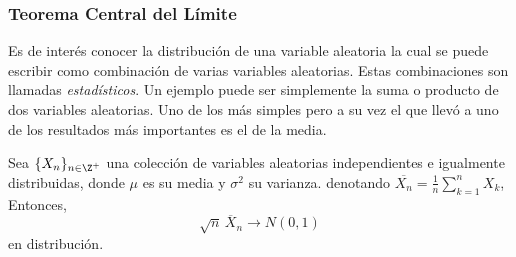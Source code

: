 \subsubsection{Teorema Central del Límite}
Es de interés conocer la distribución de una variable aleatoria la
cual se puede escribir como combinación de varias variables
aleatorias. Estas combinaciones son llamadas \emph{estadísticos}.
Un ejemplo puede ser simplemente la suma o producto de dos variables
aleatorias. Uno de los más simples pero a su vez el que llevó
a uno de los resultados más importantes es el de la media.
\begin{Teo}
  Sea $\{X_n\}_{n\in\Z^+}$ una colección de variables aleatorias
  independientes e igualmente distribuidas, donde $\mu$ es su media y $\sigma^2$
  su varianza. denotando $\overline{X_n}=\frac{1}{n}\sum_{k=1}^nX_k$, Entonces,
  \[\sqrt{n}\,\overline{X}_n\longrightarrow N(0,1)\]
  en distribución.
\end{Teo}
